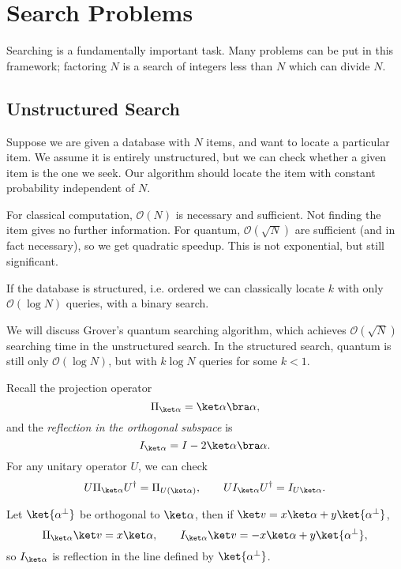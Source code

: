 \documentclass[12pt]{article}
\begin{document}
\newpage

\section{Search Problems}
\label{sec:sp}

Searching is a fundamentally important task. Many problems can be put in this framework; factoring $N$ is a search of integers less than $N$ which can divide $N$.

\subsection{Unstructured Search}
\label{sub:us}

Suppose we are given a database with $N$ items, and want to locate a particular item. We assume it is entirely unstructured, but we can check whether a given item is the one we seek. Our algorithm should locate the item with constant probability independent of $N$.

For classical computation, $\mathcal{O}(N)$ is necessary and sufficient. Not finding the item gives no further information. For quantum, $\mathcal{O}(\sqrt N)$ are sufficient (and in fact necessary), so we get quadratic speedup. This is not exponential, but still significant.

If the database is structured, i.e. ordered we can classically locate $k$ with only $\mathcal{O}(\log N)$ queries, with a binary search.

We will discuss Grover's quantum searching algorithm, which achieves $\mathcal{O}(\sqrt N)$ searching time in the unstructured search. In the structured search, quantum is still only $\mathcal{O}(\log N)$, but with $k \log N$ queries for some $k < 1$.

Recall the projection operator
\[
\Pi_{\ket \alpha} = \ket \alpha \bra \alpha,
\]
and the \emph{reflection in the orthogonal subspace} is
\[
I_{\ket \alpha} = I - 2 \ket \alpha \bra \alpha.
\]
For any unitary operator $U$, we can check
\[
U \Pi_{\ket \alpha} U^{\dagger} = \Pi_{U(\ket \alpha)}, \qquad U I_{\ket \alpha} U^{\dagger} = I_{U \ket \alpha}.
\]
\begin{exbox}
	Let $\ket{\alpha^{\perp}}$ be orthogonal to $\ket \alpha$, then if $\ket v = x \ket \alpha + y \ket{\alpha^{\perp}}$,
	\[
		\Pi_{\ket \alpha} \ket v = x \ket \alpha, \qquad I_{\ket \alpha}\ket v = - x \ket \alpha + y \ket{\alpha^{\perp}},
	\]
	so $I_{\ket \alpha}$ is reflection in the line defined by $\ket{\alpha^{\perp}}$.
\end{exbox}
\end{document}
